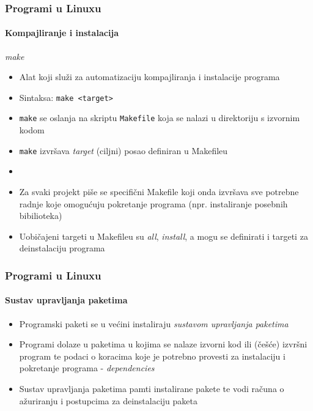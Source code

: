 \documentclass[table,usenames,dvipsnames]{beamer}
\newcommand{\shell}[1]{\texttt{#1}}
\begin{document}
\begin{frame}[t]
	\frametitle{Programi u Linuxu}
	\framesubtitle{Kompajliranje i instalacija}
	\emph{make}
	\begin{itemize}
		\item Alat koji služi za automatizaciju kompajliranja i instalacije programa
		\item[] Sintaksa: \shell{make <target>}
		\item \shell{make} se oslanja na skriptu \shell{Makefile} koja se nalazi u direktoriju s izvornim kodom
		\item \shell{make} izvršava \emph{target} (ciljni) posao definiran u Makefileu
		\item[]
		\item Za svaki projekt piše se specifični Makefile koji onda izvršava sve potrebne radnje koje omogućuju pokretanje programa (npr. instaliranje posebnih bibilioteka)
		\item Uobičajeni targeti u Makefileu su \emph{all}, \emph{install}, a mogu se definirati i targeti za deinstalaciju programa
	\end{itemize}
\end{frame}

\begin{frame}[t]
	\frametitle{Programi u Linuxu}
	\framesubtitle{Sustav upravljanja paketima}
	\begin{itemize}
		\item Programski paketi se u većini instaliraju \emph{sustavom upravljanja paketima}
		\item Programi dolaze u paketima u kojima se nalaze izvorni kod ili (češće) izvršni program te podaci o koracima koje je potrebno provesti za instalaciju i pokretanje programa - \emph{dependencies}
		\item Sustav upravljanja paketima pamti instalirane pakete te vodi računa o ažuriranju i postupcima za deinstalaciju paketa
	\end{itemize}
\end{frame}
\end{document}
